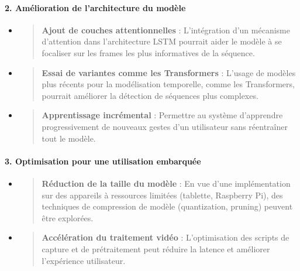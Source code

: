 \documentclass[
]{article}
\begin{document}
\hypertarget{amuxe9lioration-de-larchitecture-du-moduxe8le}{%
\paragraph{\texorpdfstring{\textbf{2. Amélioration de l'architecture du modèle}}{2. Amélioration de l'architecture du modèle}}\label{amuxe9lioration-de-larchitecture-du-moduxe8le}}

\begin{itemize}
\item
  \begin{quote}
  \textbf{Ajout de couches attentionnelles} : L'intégration d'un mécanisme d'attention dans l'architecture LSTM pourrait aider le modèle à se focaliser sur les frames les plus informatives de la séquence.
  \end{quote}
\item
  \begin{quote}
  \textbf{Essai de variantes comme les Transformers} : L'usage de modèles plus récents pour la modélisation temporelle, comme les Transformers, pourrait améliorer la détection de séquences plus complexes.
  \end{quote}
\item
  \begin{quote}
  \textbf{Apprentissage incrémental} : Permettre au système d'apprendre progressivement de nouveaux gestes d'un utilisateur sans réentraîner tout le modèle.
  \end{quote}
\end{itemize}

\hypertarget{optimisation-pour-une-utilisation-embarquuxe9e}{%
\paragraph{\texorpdfstring{\textbf{3. Optimisation pour une utilisation embarquée}}{3. Optimisation pour une utilisation embarquée}}\label{optimisation-pour-une-utilisation-embarquuxe9e}}

\begin{itemize}
\item
  \begin{quote}
  \textbf{Réduction de la taille du modèle} : En vue d'une implémentation sur des appareils à ressources limitées (tablette, Raspberry Pi), des techniques de compression de modèle (quantization, pruning) peuvent être explorées.
  \end{quote}
\item
  \begin{quote}
  \textbf{Accélération du traitement vidéo} : L'optimisation des scripts de capture et de prétraitement peut réduire la latence et améliorer l'expérience utilisateur.
  \end{quote}
\end{itemize}
\end{document}
